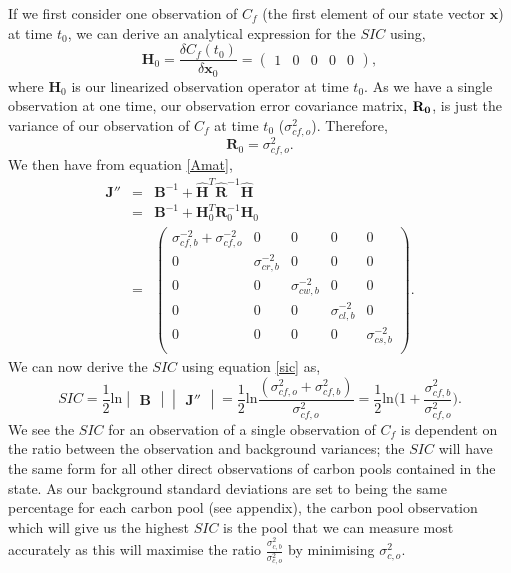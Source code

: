 \documentclass[11pt]{article}
\begin{document}
If we first consider one observation of $C_f$ (the first element of our state vector $\textbf{x}$) at time $t_0$, we can derive an analytical expression for the $SIC$ using,
\begin{equation}
\mathbf{H}_{0} = \frac{\delta C_f(t_0)}{\delta\textbf{x}_0} = \begin{pmatrix}
1 & 0 & 0 & 0 & 0
\end{pmatrix},
\end{equation} 
where $\mathbf{H}_{0}$ is our linearized observation operator at time $t_0$. As we have a single observation at one time, our observation error covariance matrix, $\bf{R}_0$, is just the variance of our observation of $C_f$ at time $t_0$ ($\sigma_{cf,o}^{2}$). Therefore,
\begin{equation}
\mathbf{R}_0=\sigma_{cf,o}^{2}.
\end{equation}
We then have from equation \ref{Amat},
\begin{equation}
\begin{array} {lcl}
\mathbf{J}'' &=& \mathbf{B}^{-1}+\hat{\mathbf{H}}^{T}\hat{\mathbf{R}}^{-1}\hat{\mathbf{H}} \\
&=& \mathbf{B}^{-1}+\mathbf{H}_0^{T}\mathbf{R}_0^{-1}\mathbf{H}_0 \\
&=& \begin{pmatrix} 
\sigma_{cf,b}^{-2}+\sigma_{cf,o}^{-2} & 0 & 0 & 0 & 0 \\
0 & \sigma_{cr,b}^{-2} & 0 & 0 & 0 \\
0 & 0 & \sigma_{cw,b}^{-2} & 0 & 0 \\
0 & 0 & 0 & \sigma_{cl,b}^{-2} & 0 \\
0 & 0 & 0 & 0 & \sigma_{cs,b}^{-2} \\
\end{pmatrix}.
\end{array}
\end{equation} 
We can now derive the $SIC$ using equation \ref{sic} as,
\begin{equation}
SIC = \frac{1}{2}\text{ln}\begin{vmatrix} \mathbf{B} \end{vmatrix}\begin{vmatrix} \mathbf{J}'' \end{vmatrix}= \frac{1}{2}\text{ln}\frac{(\sigma_{cf,o}^{2}+\sigma_{cf,b}^{2})}{\sigma_{cf,o}^{2}}
=\frac{1}{2}\text{ln} \bigg(1+\frac{\sigma_{cf,b}^{2}}{\sigma_{cf,o}^{2}}\bigg). \label{siccf1time}
\end{equation}
We see the $SIC$ for an observation of a single observation of $C_f$ is dependent on the ratio between the observation and background variances; the $SIC$ will have the same form for all other direct observations of carbon pools contained in the state. As our background standard deviations are set to being the same percentage for each carbon pool (see appendix), the carbon pool observation which will give us the highest $SIC$ is the pool that we can measure most accurately as this will maximise the ratio $\frac{\sigma_{c,b}^{2}}{\sigma_{c,o}^{2}}$ by minimising $\sigma_{c,o}^{2}$.
\end{document}
